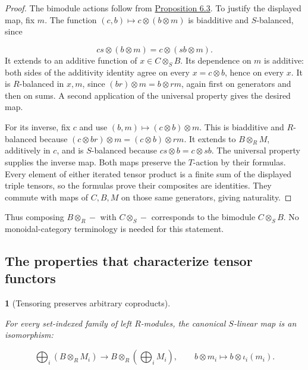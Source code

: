 \documentclass[11pt,a4paper]{article}
\newcommand{\mathheading}{}
\theoremstyle{plain}
\newtheorem*{plainstatement}{\mathheading}
\theoremstyle{definition}
\newenvironment{mathstatement}[3]{\renewcommand{\mathheading}{#1 #2}\begin{plainstatement}[#3]}{\end{plainstatement}}
\begin{document}
\begin{proof}

The bimodule actions follow from \hyperref[env-6-3]{Proposition 6.3}. To justify the displayed map, fix \(m\). The function \((c,b)\mapsto c\otimes(b\otimes m)\) is biadditive and \(S\)-balanced, since

 \[cs\otimes(b\otimes m)=c\otimes(sb\otimes m).\] 
It extends to an additive function of \(x\in C\otimes_S B\). Its dependence on \(m\) is additive: both sides of the additivity identity agree on every \(x=c\otimes b\), hence on every \(x\). It is \(R\)-balanced in \(x,m\), since \((br)\otimes m=b\otimes rm\), again first on generators and then on sums. A second application of the universal property gives the desired map.


For its inverse, fix \(c\) and use \((b,m)\mapsto(c\otimes b)\otimes m\). This is biadditive and \(R\)-balanced because \((c\otimes br)\otimes m=(c\otimes b)\otimes rm\). It extends to \(B\otimes_R M\), additively in \(c\), and is \(S\)-balanced because \(cs\otimes b=c\otimes sb\). The universal property supplies the inverse map. Both maps preserve the \(T\)-action by their formulas. Every element of either iterated tensor product is a finite sum of the displayed triple tensors, so the formulas prove their composites are identities. They commute with maps of \(C,B,M\) on those same generators, giving naturality.


\end{proof}
 
Thus composing \(B\otimes_R-\) with \(C\otimes_S-\) corresponds to the bimodule \(C\otimes_S B\). No monoidal-category terminology is needed for this statement.

 
\subsection{The properties that characterize tensor functors}
\label{exactness}
 
\begin{mathstatement}{Theorem}{6.6}{Tensoring preserves arbitrary coproducts}
\label{env-6-6}

For every set-indexed family of left \(R\)-modules, the canonical \(S\)-linear map is an isomorphism:

 \[\bigoplus_i(B\otimes_R M_i)\longrightarrow B\otimes_R\left(\bigoplus_i M_i\right),\qquad b\otimes m_i\longmapsto b\otimes\iota_i(m_i).\] 
\par{}\par

\end{mathstatement}
 
\end{document}
